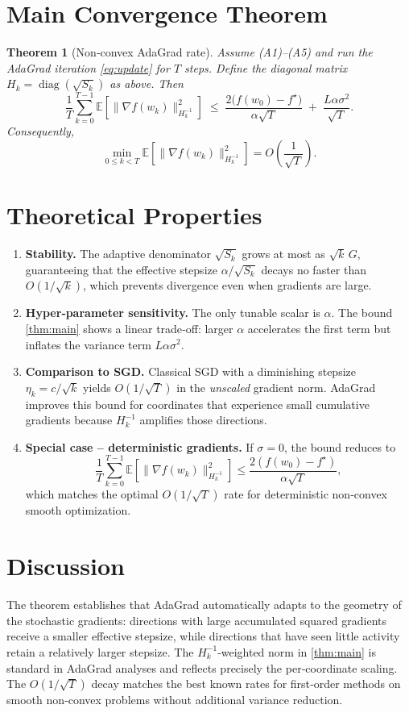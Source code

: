 \documentclass{article}
\newtheorem{theorem}{Theorem}
\begin{document}
\section*{Main Convergence Theorem}
\begin{theorem}[Non‑convex AdaGrad rate]\label{thm:main}
Assume (A1)–(A5) and run the AdaGrad iteration \eqref{eq:update} for $T$ steps.
Define the diagonal matrix $H_{k}=\operatorname{diag}(\sqrt{S_{k}})$ as above.
Then
\[
\frac{1}{T}\sum_{k=0}^{T-1}
\mathbb{E}\!\left[\bigl\|\nabla f(w_{k})\bigr\|^{2}_{H_{k}^{-1}}\right]
\;\le\;
\frac{2\bigl(f(w_{0})-f^{\star}\bigr)}{\alpha\sqrt{T}}
\;+\;
\frac{L\alpha\sigma^{2}}{\sqrt{T}} .
\tag{1}
\]
Consequently,
\[
\min_{0\le k<T}\mathbb{E}\!\left[\bigl\|\nabla f(w_{k})\bigr\|^{2}_{H_{k}^{-1}}\right]
= O\!\left(\frac{1}{\sqrt{T}}\right).
\]
\end{theorem}

\section*{Theoretical Properties}
\begin{enumerate}
\item \textbf{Stability.} The adaptive denominator $\sqrt{S_{k}}$ grows at most as $\sqrt{k}\,G$, guaranteeing that the effective stepsize $\alpha/\sqrt{S_{k}}$ decays no faster than $O(1/\sqrt{k})$, which prevents divergence even when gradients are large.
\item \textbf{Hyper‑parameter sensitivity.} The only tunable scalar is $\alpha$. The bound \eqref{thm:main} shows a linear trade‑off: larger $\alpha$ accelerates the first term but inflates the variance term $L\alpha\sigma^{2}$.
\item \textbf{Comparison to SGD.} Classical SGD with a diminishing stepsize $\eta_{k}=c/\sqrt{k}$ yields $O(1/\sqrt{T})$ in the \emph{unscaled} gradient norm. AdaGrad improves this bound for coordinates that experience small cumulative gradients because $H_{k}^{-1}$ amplifies those directions.
\item \textbf{Special case – deterministic gradients.} If $\sigma=0$, the bound reduces to
\[
\frac{1}{T}\sum_{k=0}^{T-1}
\mathbb{E}\!\left[\|\nabla f(w_{k})\|^{2}_{H_{k}^{-1}}\right]
\le \frac{2(f(w_{0})-f^{\star})}{\alpha\sqrt{T}},
\]
which matches the optimal $O(1/\sqrt{T})$ rate for deterministic non‑convex smooth optimization.
\end{enumerate}

\section*{Discussion}
The theorem establishes that AdaGrad automatically adapts to the geometry of the stochastic gradients: directions with large accumulated squared gradients receive a smaller effective stepsize, while directions that have seen little activity retain a relatively larger stepsize. The $H_{k}^{-1}$‑weighted norm in \eqref{thm:main} is standard in AdaGrad analyses and reflects precisely the per‑coordinate scaling. The $O(1/\sqrt{T})$ decay matches the best known rates for first‑order methods on smooth non‑convex problems without additional variance reduction.
\end{document}
